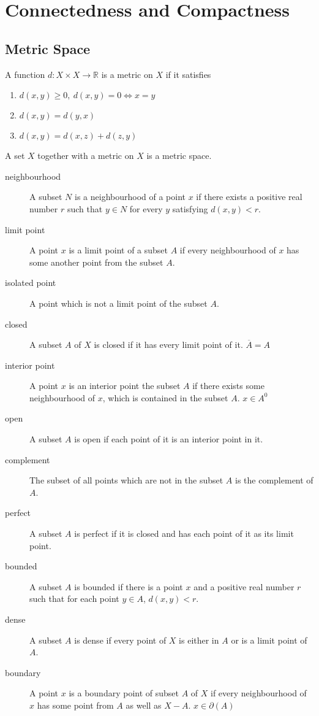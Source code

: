 \chapter{Connectedness and Compactness}

\section{Metric Space}
	\begin{definition}
		A function $d : X \times X \to \mathbb{R}$ is a metric on $X$ if it satisfies
		\begin{enumerate}
			\item $d(x,y) \ge 0,\ d(x,y) = 0 \iff x = y$
			\item $d(x,y) = d(y,x)$
			\item $d(x,y) = d(x,z) + d(z,y)$
		\end{enumerate}
	\end{definition}
	\begin{definition}
		A set $X$ together with a metric on $X$ is a metric space.
	\end{definition}
	\begin{description}
		\item[neighbourhood] A subset $N$ is a neighbourhood of a point $x$ if there exists a positive real number $r$ such that $y \in N$ for every $y$ satisfying $d(x,y) < r$.
		\item[limit point] A point $x$ is a limit point of a subset $A$ if every neighbourhood of $x$ has some another point from the subset $A$.
		\item[isolated point] A point which is not a limit point of the subset $A$.
		\item[closed] A subset $A$ of $X$ is closed if it has every limit point of it. $\overline{A} = A$
		\item[interior point] A point $x$ is an interior point the subset $A$ if there exists some neighbourhood of $x$, which is contained in the subset $A$. $x \in A^0$
		\item[open] A subset $A$ is open if each point of it is an interior point in it.
		\item[complement] The subset of all points which are not in the subset $A$ is the complement of $A$.
		\item[perfect] A subset $A$ is perfect if it is closed and has each point of it as its limit point.
		\item[bounded] A subset $A$ is bounded if there is a point $x$ and a positive real number $r$ such that for each point $y \in A$, $d(x,y) < r$.
		\item[dense] A subset $A$ is dense if every point of $X$ is either in $A$ or is a limit point of $A$.
		\item[boundary] A point $x$ is a boundary point of subset $A$ of $X$ if every neighbourhood of $x$ has some point from $A$ as well as $X-A$. $x \in \partial(A)$
	\end{description}

